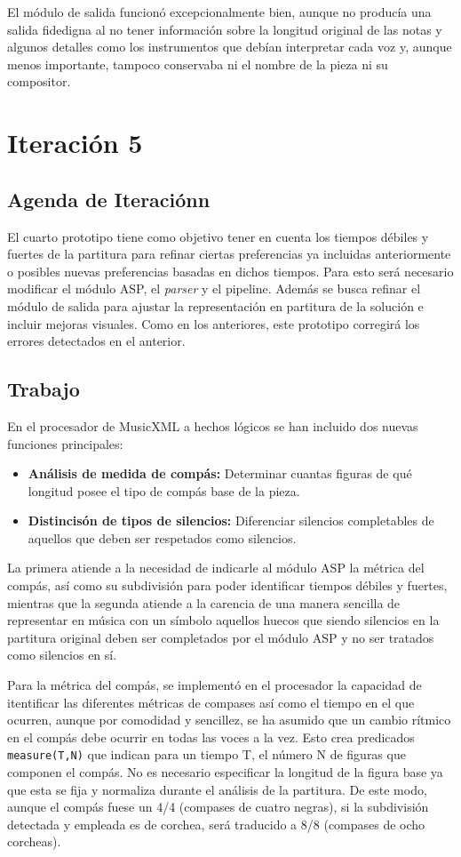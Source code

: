 El módulo de salida funcionó excepcionalmente bien, aunque no producía una salida fidedigna al no tener información sobre la longitud original de las notas y algunos detalles como los instrumentos que debían interpretar cada voz y, aunque menos importante, tampoco conservaba ni el nombre de la pieza ni su compositor.

\section{Iteración 5}
\subsection{Agenda de Iteraciónn}
El cuarto prototipo tiene como objetivo tener en cuenta los tiempos débiles y fuertes de la partitura para refinar ciertas preferencias ya incluidas anteriormente o posibles nuevas preferencias basadas en dichos tiempos. Para esto será necesario modificar el módulo ASP, el \textit{parser} y el pipeline. Además se busca refinar el módulo de salida para ajustar la representación en partitura de la solución e incluir mejoras visuales. Como en los anteriores, este prototipo corregirá los errores detectados en el anterior.

\subsection{Trabajo}
En el procesador de MusicXML a hechos lógicos se han incluido dos nuevas funciones principales: 
\begin{itemize}
	\item \textbf{Análisis de medida de compás:} Determinar cuantas figuras de qué longitud posee el tipo de compás base de la pieza.
	\item \textbf{Distincisón de tipos de silencios:} Diferenciar silencios completables de aquellos que deben ser respetados como silencios.
\end{itemize}
La primera atiende a la necesidad de indicarle al módulo ASP la métrica del compás, así como su subdivisión para poder identificar tiempos débiles y fuertes, mientras que la segunda atiende a la carencia de una manera sencilla de representar en música con un símbolo aquellos huecos que siendo silencios en la partitura original deben ser completados por el módulo ASP y no ser tratados como silencios en sí. 

Para la métrica del compás, se implementó en el procesador la capacidad de itentificar las diferentes métricas de compases así como el tiempo en el que ocurren, aunque por comodidad y sencillez, se ha asumido que un cambio rítmico en el compás debe ocurrir en todas las voces a la vez. Esto crea predicados \texttt{measure(T,N)} que indican para un tiempo T, el número N de figuras que componen el compás. No es necesario especificar la longitud de la figura base ya que esta se fija y normaliza durante el análisis de la partitura. De este modo, aunque el compás fuese un 4/4 (compases de cuatro negras), si la subdivisión detectada y empleada es de corchea, será traducido a 8/8 (compases de ocho corcheas). 

